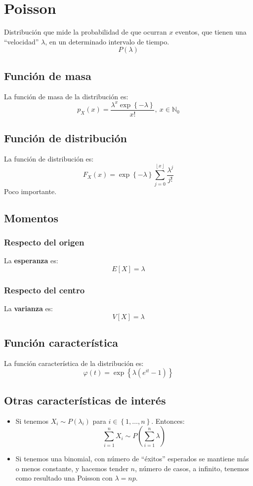 \section{Poisson}
\label{sec:poisson}
Distribución que mide la probabilidad de que ocurran $x$ eventos, que tienen una ``velocidad'' $\lambda$, en un determinado intervalo de tiempo.
\[
\boxed{P\left( \lambda \right)}
\]

\subsection{Función de masa}
La función de masa de la distribución es:
\[
p_X \left( x \right) = \frac{\lambda^x \exp\left\{ -\lambda \right\}}{x!},\ x \in \mathbb{N}_0
\]

\subsection{Función de distribución}
La función de distribución es:
\[
F_X\left( x \right) = \exp\left\{ -\lambda \right\}\sum_{j=0}^{\left\lfloor x \right\rfloor} \frac{\lambda^j}{j!} 
\]
Poco importante.

\subsection{Momentos}

\subsubsection*{Respecto del origen}
La \textbf{esperanza} es: 
\[
    E\left[ X \right] = \lambda
\]
\subsubsection*{Respecto del centro}
La \textbf{varianza} es:
\[
    V\left[ X \right] = \lambda
\]

\subsection{Función característica}
La función característica de la distribución es:
\[
\varphi\left( t \right) = \exp\left\{ \lambda\left( e^{it} - 1 \right) \right\}
\]

\subsection{Otras características de interés}
\begin{itemize}
    \item Si tenemos $X_i \sim P\left( \lambda_i \right)$ para $i \in\left\{ 1, \ldots, n \right\}$. Entonces:
    \[
    \sum_{i=1}^{n} X_i \sim P\left( \sum_{i=1}^{n} \lambda \right) 
    \]
    \item Si tenemos una binomial, con número de ``éxitos'' esperados se mantiene más o menos constante, y hacemos tender $n$, número de casos, a infinito, tenemos como resultado una Poisson con $\lambda = np$.
\end{itemize}
